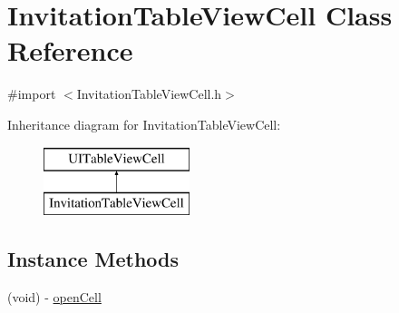 \hypertarget{interface_invitation_table_view_cell}{\section{Invitation\+Table\+View\+Cell Class Reference}
\label{interface_invitation_table_view_cell}
}


{\ttfamily \#import $<$Invitation\+Table\+View\+Cell.\+h$>$}

Inheritance diagram for Invitation\+Table\+View\+Cell\+:\begin{figure}[H]
\begin{center}
\leavevmode
\includegraphics[height=2.000000cm]{interface_invitation_table_view_cell}
\end{center}
\end{figure}
\subsection*{Instance Methods}
\begin{DoxyCompactItemize}
\item 
(void) -\/ \hyperlink{interface_invitation_table_view_cell_aa27db52d8a518af54b9d981ed6dca4e1}{open\+Cell}
\end{DoxyCompactItemize}
